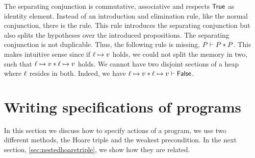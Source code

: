 \documentclass[thesis.tex]{subfiles}
\begin{document}
The separating conjunction is commutative, associative and respects $\textsf{\upshape True}$ as identity element. Instead of an introduction and elimination rule, like the normal conjunction, there is the  rule. This rule introduces the separating conjunction but also splits the hypotheses over the introduced propositions. The separating conjunction is not duplicable. Thus, the following rule is missing, $P \vdash P * P$. This makes intuitive sense since if $\loc\fmapsto\val$ holds, we could not split the memory in two, such that $\loc\fmapsto\val * \loc\fmapsto\val$ holds. We cannot have two disjoint sections of a heap where $\ell$ resides in both. Indeed, we have $\loc\fmapsto\val * \loc\fmapsto\val \proves \FALSE$.

\section{Writing specifications of programs}
\label{sec:Hoare}
In this section we discuss how to specify actions of a program, we use two different methods, the Hoare triple and the weakest precondition. In the next section, \cref*{sec:nestedhoaretriple}, we show how they are related.
\end{document}
